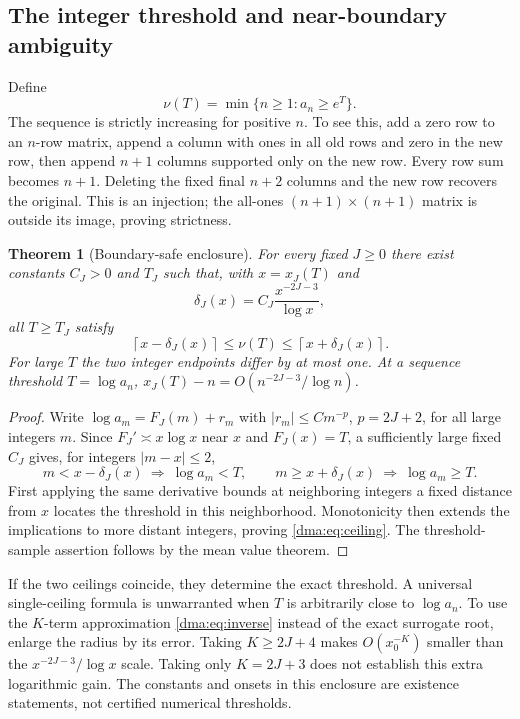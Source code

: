 \documentclass[11pt,letterpaper]{article}
\newtheorem{theorem}{Theorem}[section]
\theoremstyle{remark}\newtheorem{remark}[theorem]{Remark}
\begin{document}
\subsection{The integer threshold and near-boundary ambiguity}
Define
\[
 \nu(T)=\min\{n\geq1:a_n\geq e^T\}.
\]
The sequence is strictly increasing for positive $n$. To see this, add a zero row to an $n$-row matrix, append a column with ones in all old rows and zero in the new row, then append $n+1$ columns supported only on the new row. Every row sum becomes $n+1$. Deleting the fixed final $n+2$ columns and the new row recovers the original. This is an injection; the all-ones $(n+1)\times(n+1)$ matrix is outside its image, proving strictness.

\begin{theorem}[Boundary-safe enclosure]\label{dma:thm:ceiling}
For every fixed $J\geq0$ there exist constants $C_J>0$ and $T_J$ such that, with $x=x_J(T)$ and
\[
 \delta_J(x)=C_J\frac{x^{-2J-3}}{\log x},
\]
all $T\geq T_J$ satisfy
\begin{equation}\label{dma:eq:ceiling}
 \left\lceil x-\delta_J(x)\right\rceil\leq\nu(T)
 \leq\left\lceil x+\delta_J(x)\right\rceil.
\end{equation}
For large $T$ the two integer endpoints differ by at most one. At a sequence threshold $T=\log a_n$,
$x_J(T)-n=O(n^{-2J-3}/\log n)$.
\end{theorem}
\begin{proof}
Write $\log a_m=F_J(m)+r_m$ with $|r_m|\leq C m^{-p}$, $p=2J+2$, for all large integers $m$. Since $F_J'\asymp x\log x$ near $x$ and $F_J(x)=T$, a sufficiently large fixed $C_J$ gives, for integers $|m-x|\leq2$,
\[
 m<x-\delta_J(x)\ \Longrightarrow\ \log a_m<T,
 \qquad
 m\geq x+\delta_J(x)\ \Longrightarrow\ \log a_m\geq T.
\]
First applying the same derivative bounds at neighboring integers a fixed distance from $x$ locates the threshold in this neighborhood. Monotonicity then extends the implications to more distant integers, proving \eqref{dma:eq:ceiling}. The threshold-sample assertion follows by the mean value theorem.
\end{proof}
If the two ceilings coincide, they determine the exact threshold. A universal single-ceiling formula is unwarranted when $T$ is arbitrarily close to $\log a_n$. To use the $K$-term approximation \eqref{dma:eq:inverse} instead of the exact surrogate root, enlarge the radius by its error. Taking $K\geq2J+4$ makes $O(x_0^{-K})$ smaller than the $x^{-2J-3}/\log x$ scale. Taking only $K=2J+3$ does not establish this extra logarithmic gain. The constants and onsets in this enclosure are existence statements, not certified numerical thresholds.
\end{document}
